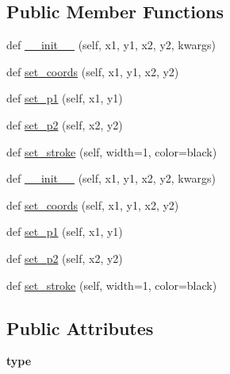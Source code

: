 \subsection*{Public Member Functions}
\begin{DoxyCompactItemize}
\item 
def \hyperlink{classremi_1_1gui_1_1SvgLine_a0c8992fc14b08f54653fa6b26115c0e5}{\+\_\+\+\_\+init\+\_\+\+\_\+} (self, x1, y1, x2, y2, kwargs)
\item 
def \hyperlink{classremi_1_1gui_1_1SvgLine_af09b3c7641d0be2ca7c8b4ce2c6542e2}{set\+\_\+coords} (self, x1, y1, x2, y2)
\item 
def \hyperlink{classremi_1_1gui_1_1SvgLine_a87fe94fb40555fa768a92cc6e604e319}{set\+\_\+p1} (self, x1, y1)
\item 
def \hyperlink{classremi_1_1gui_1_1SvgLine_a12864666511dd40ead1b3ee37badc6dd}{set\+\_\+p2} (self, x2, y2)
\item 
def \hyperlink{classremi_1_1gui_1_1SvgLine_abe91b2db04526f47656ee87b41693c62}{set\+\_\+stroke} (self, width=1, color=\textquotesingle{}black\textquotesingle{})
\item 
def \hyperlink{classremi_1_1gui_1_1SvgLine_a0c8992fc14b08f54653fa6b26115c0e5}{\+\_\+\+\_\+init\+\_\+\+\_\+} (self, x1, y1, x2, y2, kwargs)
\item 
def \hyperlink{classremi_1_1gui_1_1SvgLine_af09b3c7641d0be2ca7c8b4ce2c6542e2}{set\+\_\+coords} (self, x1, y1, x2, y2)
\item 
def \hyperlink{classremi_1_1gui_1_1SvgLine_a87fe94fb40555fa768a92cc6e604e319}{set\+\_\+p1} (self, x1, y1)
\item 
def \hyperlink{classremi_1_1gui_1_1SvgLine_a12864666511dd40ead1b3ee37badc6dd}{set\+\_\+p2} (self, x2, y2)
\item 
def \hyperlink{classremi_1_1gui_1_1SvgLine_abe91b2db04526f47656ee87b41693c62}{set\+\_\+stroke} (self, width=1, color=\textquotesingle{}black\textquotesingle{})
\end{DoxyCompactItemize}
\subsection*{Public Attributes}
\begin{DoxyCompactItemize}
\item 
{\bfseries type}\hypertarget{classremi_1_1gui_1_1SvgLine_a54a524aa46f9477e9372bea97553c6e5}{}\label{classremi_1_1gui_1_1SvgLine_a54a524aa46f9477e9372bea97553c6e5}

\end{DoxyCompactItemize}
